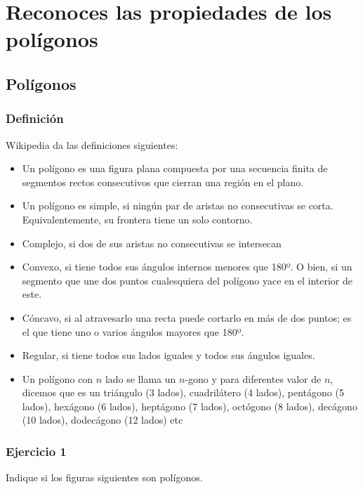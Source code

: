 \chapter{Reconoces las propiedades de los polígonos}

\section{Polígonos}

\subsection{Definición}

Wikipedia da las definiciones siguientes:

\begin{itemize}
\item Un polígono es una figura plana compuesta por una secuencia finita de
segmentos rectos consecutivos que cierran una región en el plano.
\item Un polígono es simple, si ningún par de aristas no consecutivas se corta.
  Equivalentemente, su frontera tiene un solo contorno.
\item Complejo, si dos de sus aristas no consecutivas se intersecan
\item Convexo, si tiene todos sus ángulos internos menores que 180º. O bien,
  si un segmento que une dos puntos cualesquiera del polígono yace en el
  interior de este.
\item Cóncavo, si al atravesarlo una recta puede cortarlo en más de dos puntos; es el que tiene uno o varios ángulos mayores que 180º.
\item Regular, si tiene todos sus lados iguales y todos sus ángulos iguales.
\item Un polígono con $n$ lado se llama un $n$-gono y para diferentes valor de
  $n$, dicemos que es un triángulo (3 lados), cuadrilátero (4 lados), pentágono
(5 lados), hexágono (6 lados), heptágono (7 lados), octógono (8 lados),
decágono (10 lados), dodecágono (12 lados) etc
\end{itemize}

\subsection{Ejercicio 1}

Indique si los figuras siguientes son polígonos.

